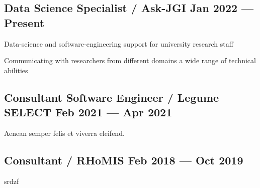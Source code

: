 \documentclass[letter,10pt]{article}
\begin{document}
\subsection{{Data Science Specialist / Ask-JGI \hfill Jan 2022 --- Present}}
\begin{zitemize}
\item Data-science and software-engineering support for university research staff 
\item Communicating with researchers from different domains a wide range of technical abilities
\end{zitemize}

\subsection{{Consultant Software Engineer / Legume SELECT \hfill Feb 2021 --- Apr 2021}}
\begin{zitemize}
\item Aenean semper felis et viverra eleifend.

\end{zitemize}

\subsection{{Consultant / RHoMIS \hfill Feb 2018 --- Oct 2019}}
\begin{zitemize}
\item srdzf
\end{zitemize}
\end{document}
